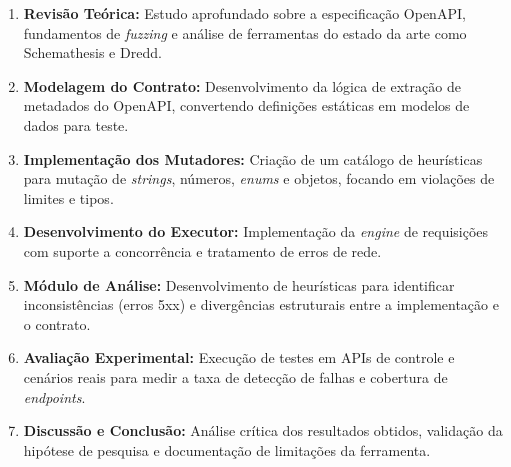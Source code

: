 \begin{enumerate}
    \item \textbf{Revisão Teórica:} Estudo aprofundado sobre a especificação OpenAPI, fundamentos de \textit{fuzzing} e análise de ferramentas do estado da arte como Schemathesis e Dredd.
    \item \textbf{Modelagem do Contrato:} Desenvolvimento da lógica de extração de metadados do OpenAPI, convertendo definições estáticas em modelos de dados para teste.
    \item \textbf{Implementação dos Mutadores:} Criação de um catálogo de heurísticas para mutação de \textit{strings}, números, \textit{enums} e objetos, focando em violações de limites e tipos.
    \item \textbf{Desenvolvimento do Executor:} Implementação da \textit{engine} de requisições com suporte a concorrência e tratamento de erros de rede.
    \item \textbf{Módulo de Análise:} Desenvolvimento de heurísticas para identificar inconsistências (erros 5xx) e divergências estruturais entre a implementação e o contrato.
    \item \textbf{Avaliação Experimental:} Execução de testes em APIs de controle e cenários reais para medir a taxa de detecção de falhas e cobertura de \textit{endpoints}.
    \item \textbf{Discussão e Conclusão:} Análise crítica dos resultados obtidos, validação da hipótese de pesquisa e documentação de limitações da ferramenta.
\end{enumerate}
